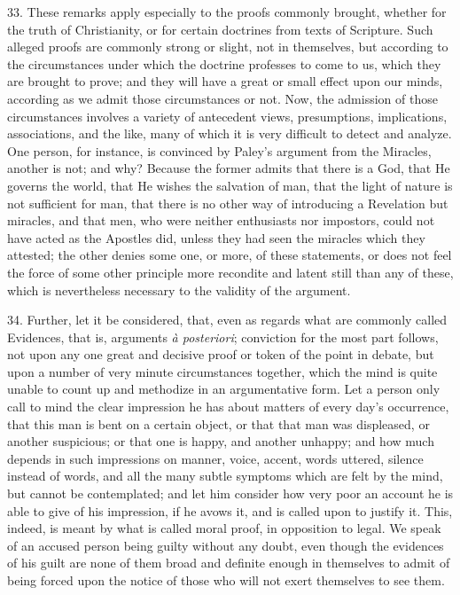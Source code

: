 33. These remarks apply especially to the proofs commonly brought,
whether for the truth of Christianity, or for certain doctrines from
texts of Scripture. Such alleged proofs are commonly strong or slight,
not in themselves, but according to the circumstances under which the
doctrine professes to come to us, which they are brought to prove; and
they will have a great or small effect upon our minds, according as we
admit those circumstances or not. Now, the admission of those
circumstances involves a variety of antecedent views, presumptions,
implications, associations, and the like, many of which it is very
difficult to detect and analyze. One person, for instance, is
convinced by Paley's argument from the Miracles, another is not; and
why? Because the former admits that there is a God, that He governs
the world, that He wishes the salvation of man, that the light of
nature is not sufficient for man, that there is no other way of
introducing a Revelation but miracles, and that men, who were neither
enthusiasts nor impostors, could not have acted as the Apostles did,
unless they had seen the miracles which they attested; the other
denies some one, or more, of these statements, or does not feel the
force of some other principle more recondite and latent still than any
of these, which is nevertheless necessary to the validity of the
argument.

34. Further, let it be considered, that, even as regards what are
commonly called Evidences, that is, arguments \emph{à posteriori};
conviction for the most part follows, not upon any one great and
decisive proof or token of the point in debate, but upon a number of
very minute circumstances together, which the mind is quite unable to
count up and methodize in an argumentative form. Let a person only
call to mind the clear impression he has about matters of every day's
occurrence, that this man is bent on a certain object, or that that
man was displeased, or another suspicious; or that one is happy, and
another unhappy; and how much depends in such impressions on manner,
voice, accent, words uttered, silence instead of words, and all the
many subtle symptoms which are felt by the mind, but cannot be
contemplated; and let him consider how very poor an account he is able
to give of his impression, if he avows it, and is called upon to
justify it. This, indeed, is meant by what is called moral proof, in
opposition to legal. We speak of an accused person being guilty
without any doubt, even though the evidences of his guilt are none of
them broad and definite enough in themselves to admit of being forced
upon the notice of those who will not exert themselves to see them.


